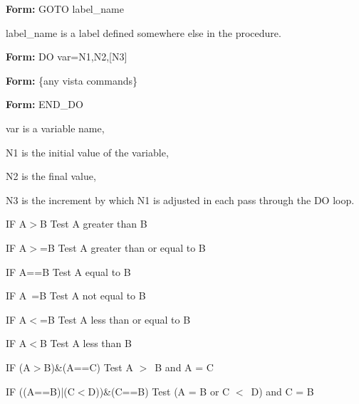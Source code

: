 {\newpage\clearpage
{}%
\begin{command}
  \item[\textbf{Form: } GOTO label\_name\hfill]{}
  \item[label\_name]{is a label defined somewhere else in the procedure.}
\end{command}%
\lthtmlfigureZ
\lthtmlcheckvsize\clearpage}

{\newpage\clearpage
{}%
\begin{command}
  \item[\textbf{Form: } DO var=N1,N2,{[N3]}\hfill]{}
  \item[\textbf{Form: } \{any vista commands\}\hfill]{}
  \item[\textbf{Form: } END\_DO\hfill]{}
  \item[var]{is a variable name,}
  \item[N1]{is the initial value of the variable,}
  \item[N2]{is the final value,}
  \item[N3]{is the increment by which N1 is adjusted in
       each pass through the DO loop.}
\end{command}%
\lthtmlfigureZ
\lthtmlcheckvsize\clearpage}

{\newpage\clearpage
{}%
\begin{example}
  \item[IF A$>$B\hfill]{Test A greater than B}
  \item[IF A$>$=B\hfill]{Test A greater than or equal to B}
  \item[IF A==B\hfill]{Test A equal to B}
  \item[IF A~=B\hfill]{Test A not equal to B}
  \item[IF A$<$=B\hfill]{Test A less than or equal to B}
  \item[IF A$<$B\hfill]{Test A less than B}
\end{example}%
\lthtmlfigureZ
\lthtmlcheckvsize\clearpage}

{\newpage\clearpage
{}%
\begin{example}
  \item[IF (A$>$B)\&(A==C)\hfill]{Test A $>$\  B and A = C}
  \item[IF ((A==B)|(C$<$D))\&(C==B)\hfill]{Test (A = B or C $<$\  D) and C = B}
\end{example}%
\lthtmlfigureZ
\lthtmlcheckvsize\clearpage}

